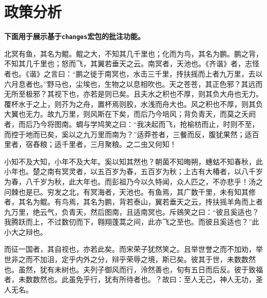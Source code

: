 
\section{政策分析}


{\bf 下面用于展示基于\verb|changes|宏包的批注功能。}

北冥有鱼，其名为鲲。鲲之大，不知其几千里也；化而为鸟，其名为鹏。鹏之背，不知其几千里也；怒而飞，其翼若垂天之云。南冥者，天池也。《齐谐》者，志怪者也。《谐》之言曰：“鹏之徙于南冥也，水击三千里，抟扶摇而上者九万里，去以六月息者也。”野马也，尘埃也，生物之以息相吹也。天之苍苍，其正色邪？其远而无所至极邪？其视下也，亦若是则已矣。且夫水之积也不厚，则其负大舟也无力。覆杯水于之上，则芥为之舟，置杯焉则胶，水浅而舟大也。风之积也不厚，则其负大翼也无力。故九万里，则风斯在下矣，而后乃今培风；背负青天，而莫之夭阏者，而后乃今将图南。蜩与学鸠笑之曰：“我决起而飞，抢榆枋而止，时则不至，而控于地而已矣，奚以之九万里而南为？”适莽苍者，三餐而反，腹犹果然；适百里者，宿舂粮；适千里者，三月聚粮。之二虫又何知！

小知不及大知，小年不及大年。奚以知其然也？朝菌不知晦朔，蟪蛄不知春秋，此小年也。楚之南有冥灵者，以五百岁为春，五百岁为秋；上古有大椿者，以八千岁为春，八千岁为秋，此大年也。而彭祖乃今以久特闻，众人匹之，不亦悲乎！汤之问棘也是已。穷发之北，有冥海者，天池也。有鱼焉，其广数千里，未有知其修者，其名为鲲。有鸟焉，其名为鹏，背若泰山，翼若垂天之云，抟扶摇羊角而上者九万里，绝云气，负青天，然后图南，且适南冥也。斥鴳笑之曰：“彼且奚适也？我腾跃而上，不过数仞而下，翱翔蓬蒿之间，此亦飞之至也。而彼且奚适也？”此小大之辩也。

而征一国者，其自视也，亦若此矣。而宋荣子犹然笑之。且举世誉之而不加劝，举世非之而不加沮，定乎内外之分，辩乎荣辱之境，斯已矣。彼其于世，未数数然也。虽然，犹有未树也。夫列子御风而行，泠然善也，旬有五日而后反。彼于致福者，未数数然也。此虽免乎行，犹有所待者也。？故曰：至人无己，神人无功，圣人无名。

